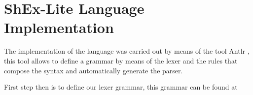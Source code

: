 \section{ShEx-Lite Language Implementation}
The implementation of the language was carried out by means of the tool Antlr ,
this tool allows to define a grammar by means of the lexer and the rules that compose the syntax and
automatically generate the parser.

First step then is to define our lexer grammar, this grammar can be found at 